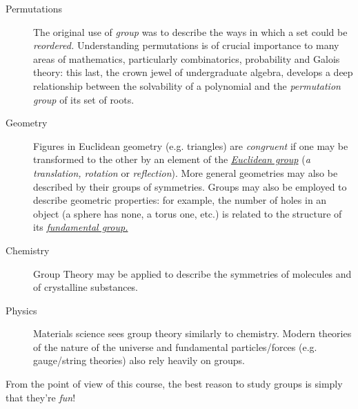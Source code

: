 \begin{description}
	\item[Permutations] The original use of \emph{group} was to describe the ways in which a set could be \emph{reordered.} Understanding permutations is of crucial importance to many areas of mathematics, particularly combinatorics, probability and Galois theory: this last, the crown jewel of undergraduate algebra, develops a deep relationship between the solvability of a polynomial and the \emph{permutation group} of its set of roots.
	\item[Geometry] Figures in Euclidean geometry (e.g.{} triangles) are \emph{congruent} if one may be transformed to the other by an element of the \emph{\href{https://en.wikipedia.org/wiki/Euclidean_group}{Euclidean group}} (\emph{a translation, rotation} or \emph{reflection}). More general geometries may also be described by their groups of symmetries. Groups may also be employed to describe geometric properties: for example, the number of holes in an object (a sphere has none, a torus one, etc.) is related to the structure of its \emph{\href{https://en.wikipedia.org/wiki/Fundamental_group}{fundamental group.}}
	\item[Chemistry] Group Theory may be applied to describe the symmetries of molecules and of crystalline substances.
	\item[Physics] Materials science sees group theory similarly to chemistry. Modern theories of the nature of the universe and fundamental particles/forces (e.g.{} gauge/string theories) also rely heavily on groups.
\end{description}

From the point of view of this course, the best reason to study groups is simply that they're \emph{fun}!

